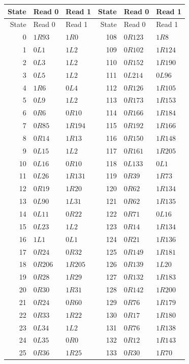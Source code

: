 \small\renewcommand{\arraystretch}{0.94}
\begin{longtable}{rll@{\qquad}rll}
\toprule State & Read 0 & Read 1 & State & Read 0 & Read 1\\\midrule
\endfirsthead
\toprule State & Read 0 & Read 1 & State & Read 0 & Read 1\\\midrule
\endhead
0 & $1R93$ & $1R0$ & 108 & $0R123$ & $1R8$\\
1 & $0L1$ & $1L2$ & 109 & $0R102$ & $1R124$\\
2 & $0L3$ & $1L2$ & 110 & $0R152$ & $1R190$\\
3 & $0L5$ & $1L2$ & 111 & $0L214$ & $0L96$\\
4 & $1R6$ & $0L4$ & 112 & $0R126$ & $1R105$\\
5 & $0L9$ & $1L2$ & 113 & $0R173$ & $1R153$\\
6 & $0R6$ & $0R10$ & 114 & $0R166$ & $1R184$\\
7 & $0R85$ & $1R194$ & 115 & $0R192$ & $1R166$\\
8 & $0R14$ & $1R13$ & 116 & $0R150$ & $1R148$\\
9 & $0L15$ & $1L2$ & 117 & $0R161$ & $1R205$\\
10 & $0L16$ & $0R10$ & 118 & $0L133$ & $0L1$\\
11 & $0L26$ & $1R131$ & 119 & $0R39$ & $1R73$\\
12 & $0R19$ & $1R20$ & 120 & $0R62$ & $1R134$\\
13 & $0L90$ & $1L31$ & 121 & $0R62$ & $1R135$\\
14 & $0L11$ & $0R22$ & 122 & $0R71$ & $0L16$\\
15 & $0L23$ & $1L2$ & 123 & $0R14$ & $1R134$\\
16 & $1L1$ & $0L1$ & 124 & $0R21$ & $1R136$\\
17 & $0R24$ & $0R32$ & 125 & $0R149$ & $1R181$\\
18 & $0R206$ & $1R205$ & 126 & $0R139$ & $1L20$\\
19 & $0R28$ & $1R29$ & 127 & $0R132$ & $1R183$\\
20 & $0R30$ & $1R31$ & 128 & $0R142$ & $1R200$\\
21 & $0R24$ & $0R60$ & 129 & $0R76$ & $1R179$\\
22 & $0R33$ & $1R22$ & 130 & $0R17$ & $1R180$\\
23 & $0L34$ & $1L2$ & 131 & $0R76$ & $1R138$\\
24 & $0L35$ & $0R0$ & 132 & $0R12$ & $1R143$\\
25 & $0R36$ & $1R25$ & 133 & $0R30$ & $1R70$\\

\end{longtable}
